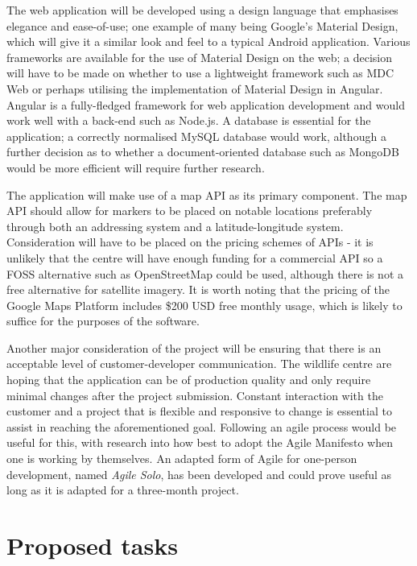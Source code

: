 \documentclass[11pt,fleqn,twoside]{article}
\begin{document}
The web application will be developed using a design language that emphasises elegance and ease-of-use; one example of many being Google's Material Design\cite{MaterialDesign}, which will give it a similar look and feel to a typical Android application. Various frameworks are available for the use of Material Design on the web; a decision will have to be made on whether to use a lightweight framework such as MDC Web\cite{MDCWeb} or perhaps utilising the implementation of Material Design in Angular\cite{Kotaru2020}. Angular is a fully-fledged framework for web application development and would work well with a back-end such as Node.js. A database is essential for the application; a correctly normalised MySQL database would work, although a further decision as to whether a document-oriented database such as MongoDB would be more efficient will require further research.

The application will make use of a map API as its primary component. The map API should allow for markers to be placed on notable locations preferably through both an addressing system and a latitude-longitude system. Consideration will have to be placed on the pricing schemes of APIs - it is unlikely that the centre will have enough funding for a commercial API so a FOSS alternative such as OpenStreetMap\cite{OSM} could be used, although there is not a free alternative for satellite imagery. It is worth noting that the pricing of the Google Maps Platform includes \$200 USD free monthly usage, which is likely to suffice for the purposes of the software\cite{GoogleMapsPlatform}.

Another major consideration of the project will be ensuring that there is an acceptable level of customer-developer communication. The wildlife centre are hoping that the application can be of production quality and only require minimal changes after the project submission. Constant interaction with the customer and a project that is flexible and responsive to change is essential to assist in reaching the aforementioned goal. Following an agile process would be useful for this, with research into how best to adopt the Agile Manifesto when one is working by themselves. An adapted form of Agile for one-person development, named \textit{Agile Solo}, has been developed\cite{nystrom_2011} and could prove useful as long as it is adapted for a three-month project.

\section{Proposed tasks}
\end{document}
